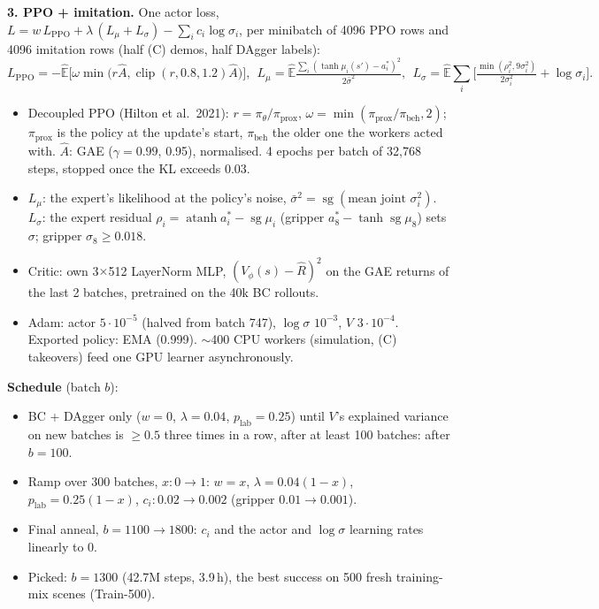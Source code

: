 \documentclass[11pt]{article}
\newcommand{\sg}{\operatorname{sg}}
\begin{document}
\textbf{3. PPO + imitation.} One actor loss, $L=w\,L_{\text{PPO}}+\lambda\,(L_\mu+L_\sigma)-\sum_i c_i\log\sigma_i$, per
minibatch of 4096 PPO rows and 4096 imitation rows (half (C) demos, half DAgger labels):
\[
  L_{\text{PPO}}=-\hat{\mathbb E}\big[\omega\min\!\big(r\hat A,\operatorname{clip}(r,0.8,1.2)\hat A\big)\big],\ \
  L_\mu=\hat{\mathbb E}\tfrac{\sum_i(\tanh\mu_i(s')-a^*_i)^2}{2\bar\sigma^2},\ \
  L_\sigma=\hat{\mathbb E}\textstyle\sum_i\Big[\tfrac{\min(\rho_i^2,9\sigma_i^2)}{2\sigma_i^2}+\log\sigma_i\Big].
\]
\begin{itemize}
  \item Decoupled PPO (Hilton et al.\ 2021): $r=\pi_\theta/\pi_{\text{prox}}$,
    $\omega=\min(\pi_{\text{prox}}/\pi_{\text{beh}},2)$; $\pi_{\text{prox}}$ is the policy at the update's start,
    $\pi_{\text{beh}}$ the older one the workers acted with. $\hat A$: GAE ($\gamma=0.99$, 0.95),
    normalised. 4 epochs per batch of 32{,}768 steps, stopped once the KL exceeds 0.03.
  \item $L_\mu$: the expert's likelihood at the policy's noise, $\bar\sigma^2=\sg(\text{mean joint }\sigma_i^2)$.
    $L_\sigma$: the expert residual $\rho_i=\operatorname{atanh}a^*_i-\sg\mu_i$ (gripper $a^*_8-\tanh\sg\mu_8$) sets
    $\sigma$; gripper $\sigma_8\ge0.018$.
  \item Critic: own 3$\times$512 LayerNorm MLP, $(V_\phi(s)-\hat R)^2$ on the GAE returns of the last 2 batches,
    pretrained on the 40k BC rollouts.
  \item Adam: actor $5\cdot10^{-5}$ (halved from batch 747), $\log\sigma$ $10^{-3}$, $V$ $3\cdot10^{-4}$. Exported
    policy: EMA (0.999). $\sim$400 CPU workers (simulation, (C) takeovers) feed one GPU learner asynchronously.
\end{itemize}
\textbf{Schedule} (batch $b$):
\begin{itemize}
  \item BC + DAgger only ($w=0$, $\lambda=0.04$, $p_{\text{lab}}=0.25$) until $V$'s explained variance on new batches
    is $\ge0.5$ three times in a row, after at least 100 batches: after $b=100$.
  \item Ramp over 300 batches, $x:0\to1$: $w=x$, $\lambda=0.04(1-x)$, $p_{\text{lab}}=0.25(1-x)$, $c_i:0.02\to0.002$
    (gripper $0.01\to0.001$).
  \item Final anneal, $b=1100\to1800$: $c_i$ and the actor and $\log\sigma$ learning rates linearly to 0.
  \item Picked: $b=1300$ (42.7M steps, 3.9\,h), the best success on 500 fresh training-mix scenes (Train-500).
\end{itemize}
\end{document}
